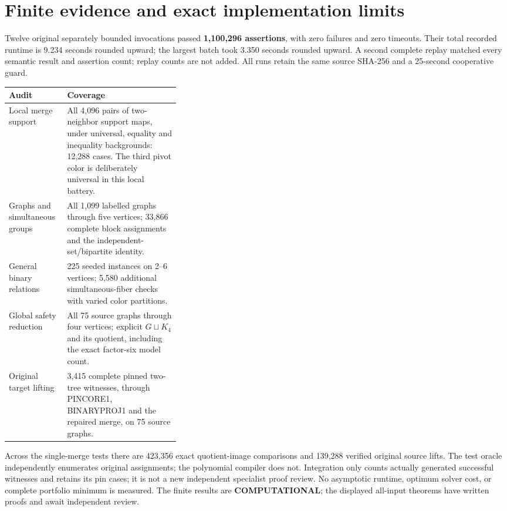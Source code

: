 \documentclass[11pt]{article}
\begin{document}
\section{Finite evidence and exact implementation limits}
Twelve original separately bounded invocations passed
\textbf{1,100,296 assertions}, with zero failures and zero timeouts.
Their total recorded runtime is 9.234 seconds rounded upward; the largest
batch took 3.350 seconds rounded upward. A second complete replay matched
every semantic result and assertion count; replay counts are not added.
All runs retain the same source SHA-256 and a 25-second cooperative guard.
\begin{center}\small
\begin{tabularx}{\linewidth}{p{0.34\linewidth}X}\toprule
Audit & Coverage\\\midrule
Local merge support & All 4,096 pairs of two-neighbor support maps, under
universal, equality and inequality backgrounds: 12,288 cases. The third pivot
color is deliberately universal in this local battery.\\
Graphs and simultaneous groups & All 1,099 labelled graphs through five
vertices; 33,866 complete block assignments and the independent-set/bipartite
identity.\\
General binary relations & 225 seeded instances on 2--6 vertices; 5,580
additional simultaneous-fiber checks with varied color partitions.\\
Global safety reduction & All 75 source graphs through four vertices; explicit
$G\sqcup K_4$ and its quotient, including the exact factor-six model count.\\
Original target lifting & 3,415 complete pinned two-tree witnesses, through
PINCORE1, BINARYPROJ1 and the repaired merge, on 75 source graphs.\\\bottomrule
\end{tabularx}\end{center}

Across the single-merge tests there are 423,356 exact quotient-image
comparisons and 139,288 verified original source lifts. The test oracle
independently enumerates original assignments; the polynomial compiler does
not. Integration only counts actually generated successful witnesses and
retains its pin cases; it is not a new independent specialist proof review.
No asymptotic runtime, optimum solver cost, or complete portfolio minimum
is measured. The finite results are \textbf{COMPUTATIONAL}; the displayed
all-input theorems have written proofs and await independent review.
\end{document}
